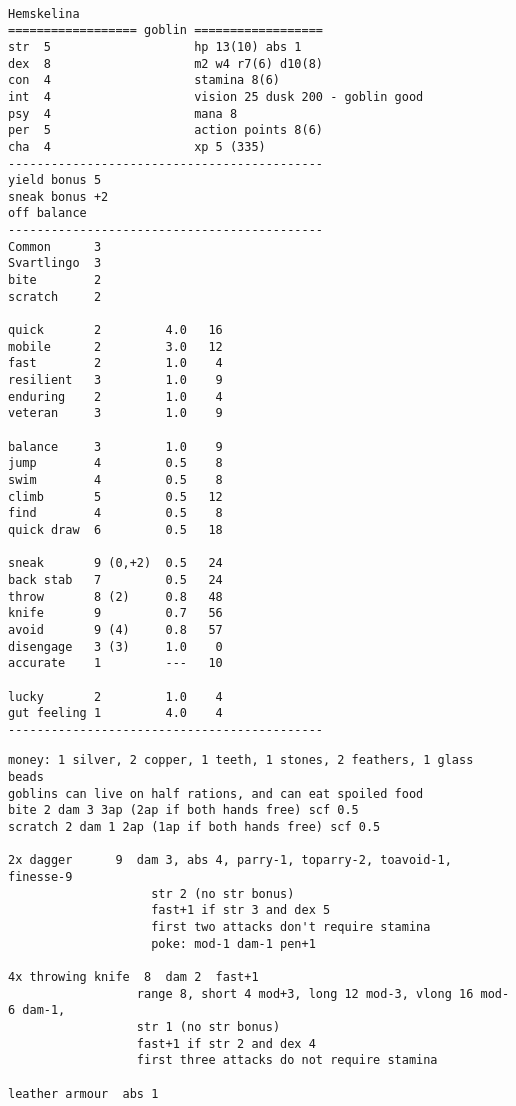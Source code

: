 \

\goodbreak \small \begin{samepage} \begin{verbatim}
Hemskelina
================== goblin ==================
str  5                    hp 13(10) abs 1
dex  8                    m2 w4 r7(6) d10(8)
con  4                    stamina 8(6)
int  4                    vision 25 dusk 200 - goblin good
psy  4                    mana 8
per  5                    action points 8(6)
cha  4                    xp 5 (335)
--------------------------------------------
yield bonus 5
sneak bonus +2
off balance
--------------------------------------------
Common      3
Svartlingo  3
bite        2
scratch     2

quick       2         4.0   16
mobile      2         3.0   12
fast        2         1.0    4
resilient   3         1.0    9
enduring    2         1.0    4
veteran     3         1.0    9

balance     3         1.0    9
jump        4         0.5    8
swim        4         0.5    8
climb       5         0.5   12
find        4         0.5    8
quick draw  6         0.5   18

sneak       9 (0,+2)  0.5   24
back stab   7         0.5   24
throw       8 (2)     0.8   48
knife       9         0.7   56
avoid       9 (4)     0.8   57
disengage   3 (3)     1.0    0
accurate    1         ---   10

lucky       2         1.0    4
gut feeling 1         4.0    4
--------------------------------------------
\end{verbatim} \goodbreak \begin{verbatim}
money: 1 silver, 2 copper, 1 teeth, 1 stones, 2 feathers, 1 glass beads
goblins can live on half rations, and can eat spoiled food
bite 2 dam 3 3ap (2ap if both hands free) scf 0.5
scratch 2 dam 1 2ap (1ap if both hands free) scf 0.5

2x dagger      9  dam 3, abs 4, parry-1, toparry-2, toavoid-1, finesse-9
                    str 2 (no str bonus)
                    fast+1 if str 3 and dex 5
                    first two attacks don't require stamina
                    poke: mod-1 dam-1 pen+1

4x throwing knife  8  dam 2  fast+1
                  range 8, short 4 mod+3, long 12 mod-3, vlong 16 mod-6 dam-1,
                  str 1 (no str bonus)
                  fast+1 if str 2 and dex 4
                  first three attacks do not require stamina

leather armour  abs 1
\end{verbatim} \end{samepage} \normalsize


























